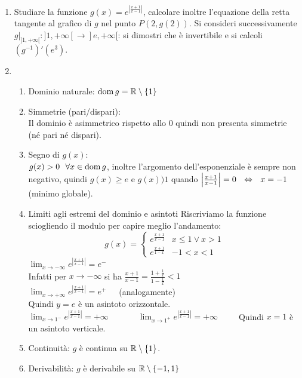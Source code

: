 \documentclass{article}
\begin{document}
\begin{enumerate}[label=\textbf{Esercizio 7.\arabic*.},itemindent=*]
    \item Studiare la funzione $\displaystyle g(x)=e^{\left|\frac{x+1}{x-1}\right|}$, calcolare inoltre l'equazione della retta tangente al grafico di $g$ nel punto $P(2,g(2))$. Si consideri successivamente $g|_{]1,+\infty[}:]1,+\infty[\to ]e,+\infty[$: si dimostri che è invertibile e si calcoli $(g^{-1})'(e^3)$.
    \item[\textit{\large Soluzione~}]~
    \begin{enumerate}[label=\arabic*.,itemindent=*]
        \item Dominio naturale: $\operatorname{dom} g=\mathbb{R}\setminus \{1\}$
        \item Simmetrie (pari/dispari):\\
        Il dominio è asimmetrico rispetto allo 0 quindi non presenta simmetrie (né pari né dispari).
        \item Segno di $g(x)$:
        \\ $g(x)>0 ~~\forall x \in \operatorname{dom} g$, inoltre l'argomento dell'esponenziale è sempre non negativo, quindi $g(x)\geq e$ e $g(x))1$ quando $\left|\frac{x+1}{x-1}\right|=0 ~~\Leftrightarrow~~x=-1$ (minimo globale).
        \item Limiti agli estremi del dominio e asintoti
            Riscriviamo la funzione sciogliendo il modulo per capire meglio l'andamento:
            \[g(x)=\begin{cases}
                e^{\frac{x+1}{x-1}}&x\leq 1\lor x>1\\
                e^\frac{x+1}{1-x}&-1<x<1
            \end{cases}\]
            $\displaystyle\lim_{x\to-\infty}e^{\left|\frac{x+1}{x-1}\right|}=e^-$\\
            Infatti per $x  \to -\infty$ si ha $\frac{x+1}{x-1}=\frac{1+\frac{1}{x}}{1-\frac{1}{x}}<1$\\
            $\displaystyle\lim_{x\to+\infty}e^{\left|\frac{x+1}{x-1}\right|}=e^+$~~~(analogamente)\\
            Quindi $y=e$ è un asintoto orizzontale.\\
            $\displaystyle\lim_{x\to1^-}e^{\left|\frac{x+1}{x-1}\right|}=+\infty$~~~~~~~$\displaystyle\lim_{x\to1^+}e^{\left|\frac{x+1}{x-1}\right|}=+\infty$~~~~~Quindi $x=1$ è un asintoto verticale.
        \item Continuità: $g$ è continua su $\mathbb{R}\setminus\{1\}$.
        \item Derivabilità: $g$ è derivabile su $\mathbb{R}\setminus\{-1,1\}$

\end{enumerate}
\end{enumerate}
\end{document}
